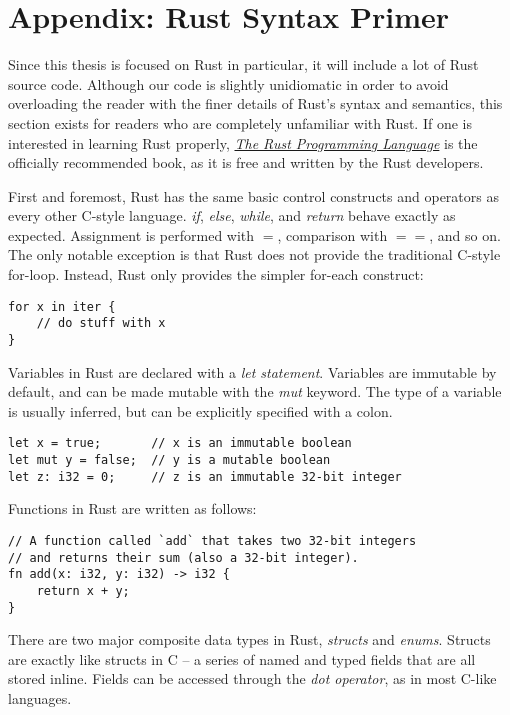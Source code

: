 \chapter{Appendix: Rust Syntax Primer}
\label{ch:syntax}

Since this thesis is focused on Rust in particular, it will include a lot of
Rust source code. Although our code is slightly unidiomatic
in order to avoid overloading the reader with the finer details of Rust's syntax
and semantics, this section exists for readers who are completely unfamiliar
with Rust. If one is interested in learning Rust properly,
\href{https://doc.rust-lang.org/book/}{\emph{The Rust Programming Language}}
is the officially recommended book, as it is free and written by the Rust developers.

First and foremost, Rust has the same basic control constructs and operators
as every other C-style language. \emph{if}, \emph{else}, \emph{while}, and
\emph{return} behave exactly as expected. Assignment is performed with $=$,
comparison with $==$, and so on. The only notable exception is that Rust does
not provide the traditional C-style for-loop. Instead, Rust only provides the
simpler for-each construct:

\begin{verbatim}
for x in iter {
    // do stuff with x
}
\end{verbatim}

Variables in Rust are declared with a \emph{let statement}. Variables are
immutable by default, and can be made mutable with the \emph{mut}
keyword. The type of a variable is usually inferred, but can be explicitly
specified with a colon.

\begin{verbatim}
let x = true;       // x is an immutable boolean
let mut y = false;  // y is a mutable boolean
let z: i32 = 0;     // z is an immutable 32-bit integer
\end{verbatim}

Functions in Rust are written as follows:

\begin{verbatim}
// A function called `add` that takes two 32-bit integers
// and returns their sum (also a 32-bit integer).
fn add(x: i32, y: i32) -> i32 {
    return x + y;
}
\end{verbatim}

There are two major composite data types in Rust, \emph{structs} and \emph{enums}.
Structs are exactly like structs in C -- a series of named and typed fields that
are all stored inline. Fields can be accessed through the \emph{dot operator},
as in most C-like languages.


